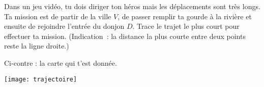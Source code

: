 \begin{enigme}

\begin{minipage}[c]{0.58\linewidth} 
Dans un jeu vidéo, tu dois diriger ton héros mais les déplacements sont très longs. Ta mission est de partir de la ville $V$, de passer remplir ta gourde à la rivière et ensuite de rejoindre l'entrée du donjon $D$. Trace le trajet le plus court pour effectuer ta mission. (Indication : la distance la plus courte entre deux points reste la ligne droite.)

Ci-contre : la carte qui t'est donnée.
 \end{minipage} \hfill%
 \begin{minipage}[c]{0.38\linewidth}
 \texttt{[image: trajectoire]}
  \end{minipage} \\
\end{enigme} 
